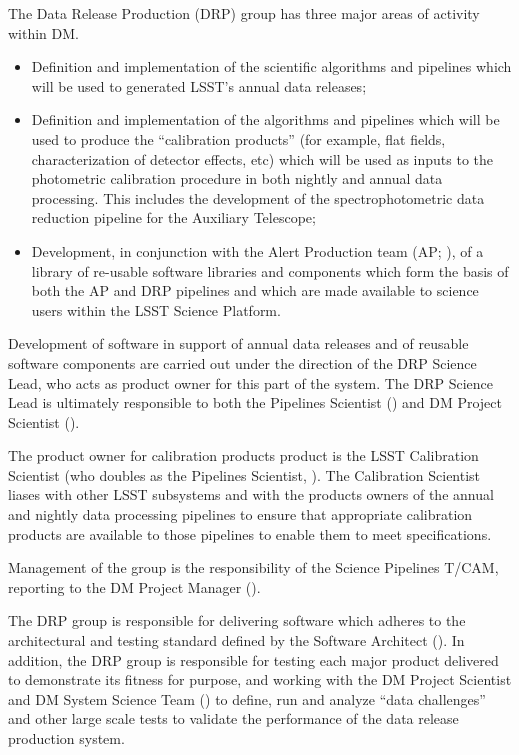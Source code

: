 The Data Release Production (DRP) group has three major areas of activity within DM.

\begin{itemize}

  \item{Definition and implementation of the scientific algorithms and pipelines which will be used to generated LSST's annual data releases;}

  \item{Definition and implementation of the algorithms and pipelines which will be used to produce the ``calibration products'' (for example, flat fields, characterization of detector effects, etc) which will be used as inputs to the photometric calibration procedure in both nightly and annual data processing. This includes the development of the spectrophotometric data reduction pipeline for the Auxiliary Telescope;}

  \item{Development, in conjunction with the Alert Production team (AP; ), of a library of re-usable software libraries and components which form the basis of both the AP and DRP pipelines and which are made available to science users within the LSST Science Platform.}

\end{itemize}

Development of software in support of annual data releases and of reusable software components are carried out under the direction of the DRP Science Lead, who acts as product owner for this part of the system.
The DRP Science Lead is ultimately responsible to both the Pipelines Scientist () and DM Project Scientist ().

The product owner for calibration products product is the LSST Calibration Scientist (who doubles as the Pipelines Scientist, ).
The Calibration Scientist liases with other LSST subsystems and with the products owners of the annual and nightly data processing pipelines to ensure that appropriate calibration products are available to those pipelines to enable them to meet specifications.

Management of the group is the responsibility of the Science Pipelines T/CAM, reporting to the DM Project Manager ().

The DRP group is responsible for delivering software which adheres to the architectural and testing standard defined by the Software Architect ().
In addition, the DRP group is responsible for testing each major product delivered to demonstrate its fitness for purpose, and working with the DM Project Scientist and DM System Science Team () to define, run and analyze ``data challenges'' and other large scale tests to validate the performance of the data release production system.

